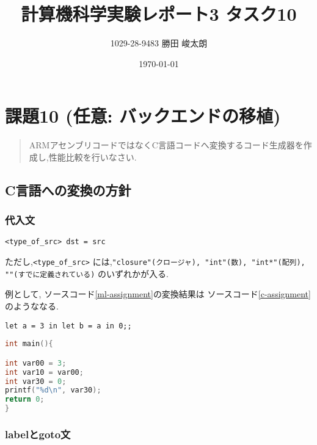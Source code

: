 



\title{計算機科学実験レポート3 タスク10}
\author{1029-28-9483 勝田 峻太朗}
\date{\today}

\maketitle

\section*{課題10 (任意: バックエンドの移植)}

\begin{quotation}
ARMアセンブリコードではなくC言語コードへ変換するコード生成器を作成し,性能比較を行いなさい.
\end{quotation}


\subsection*{C言語への変換の方針}

\subsubsection*{代入文}

\begin{lstlisting}
<type_of_src> dst = src
\end{lstlisting}

ただし,\lstinline{<type_of_src>} には,\lstinline{"closure"(クロージャ), "int"(数), "int*"(配列), ""(すでに定義されている)}
のいずれかが入る.

例として, ソースコード\ref{ml-assignment}の変換結果は ソースコード\ref{c-assignment} のようななる.

\begin{lstlisting}[label=ml-assignment, caption=MLコードの例]
let a = 3 in let b = a in 0;;
\end{lstlisting}

\begin{lstlisting}[language=C, label=c-assignment, caption=変換後のC言語]
int main(){

int var00 = 3;
int var10 = var00;
int var30 = 0;
printf("%d\n", var30);
return 0;
}
\end{lstlisting}


\subsubsection*{labelとgoto文}

